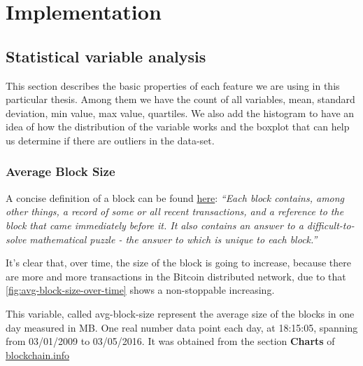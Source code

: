 
\chapter{Implementation} %

\label{ch:implementation}


\section{Statistical variable analysis}
\label{sec:stat-var-analysis}

This section describes the basic properties of each feature we are
using in this particular thesis. Among them we have the count of all
variables, mean, standard deviation, min value, max value, quartiles.
We also add the histogram to have an idea of how the distribution of
the variable works and the boxplot that can help us determine if there
are outliers in the data-set.

\subsection{Average Block Size}
\label{sec:avg-block-size}

A concise definition of a block can be found
\href{https://en.bitcoin.it/wiki/Block}{here}: \textit{``Each block
  contains, among other things, a record of some or all recent
  transactions, and a reference to the block that came immediately
  before it. It also contains an answer to a difficult-to-solve
  mathematical puzzle - the answer to which is unique to each
  block.''}

It's clear that, over time, the size of the block is going to
increase, because there are more and more transactions in the Bitcoin
distributed network, due to that
\autoref{fig:avg-block-size-over-time} shows a non-stoppable
increasing.

This variable, called avg-block-size represent the average size of the
blocks in one day measured in MB. One real number data point each day,
at 18:15:05, spanning from 03/01/2009 to 03/05/2016. It was obtained
from the section \textbf{Charts} of
\href{blockchain.info}{blockchain.info}

